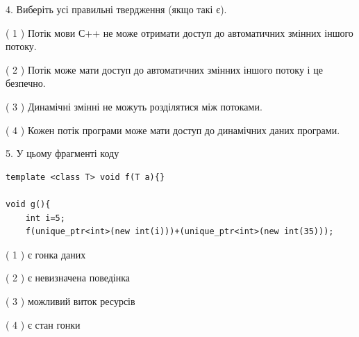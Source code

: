 \documentclass[12pt, ukrainian]{article}
\begin{document}
\begin {large}
{%
4. Виберіть усі правильні твердження (якщо такі є).\par
\vspace{2mm}

( 1 ) Потік мови С++ не може отримати доступ до автоматичних змінних іншого потоку.%

( 2 ) Потік може мати доступ до автоматичних змінних іншого потоку і це безпечно.%

( 3 ) Динамічні змінні не можуть розділятися між потоками.%

( 4 ) Кожен потік програми може мати доступ до динамічних даних програми.%


5. У цьому фрагменті коду
\begin{verbatim}
template <class T> void f(T a){}

void g(){
    int i=5;
    f(unique_ptr<int>(new int(i)))+(unique_ptr<int>(new int(35)));
\end{verbatim}
( 1 ) є гонка даних%

( 2 ) є невизначена поведінка%

( 3 ) можливий виток ресурсів%

( 4 ) є стан гонки%
}
\end {large}
\end{document}
